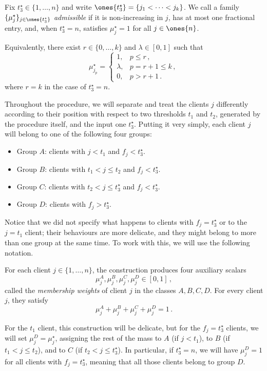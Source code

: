 \begin{property}\label{property:admissible-frontier-input}
    Fix $t_3^\star\in\{1,\dots,n\}$ and write $\ones{t_3^\star}=\{j_1<\dots<j_k\}$. We call a family $\{\mu_j^\star\}_{j\in\ones{t_3^\star}}$ \emph{admissible} if it is non-increasing in $j$, has at most one fractional entry, and, when $t_3^\star=n$, satisfies $\mu_j^\star=1$ for all $j\in\ones{n}$.

    Equivalently, there exist $r\in\{0,\dots,k\}$ and $\lambda\in[0,1]$ such that
    \begin{equation*}
        \mu_{j_p}^\star=
        \begin{cases}
            1, & p\le r\,,\\
            \lambda, & p=r+1\le k\,,\\
            0, & p>r+1\,.
        \end{cases}
    \end{equation*}
    where $r=k$ in the case of $t_3^\star=n$. 
\end{property}

Throughout the procedure, we will separate and treat the clients $j$ differently according to their position with respect to two thresholds $t_1$ and $t_2$, generated by the procedure itself, and the input one $t_3^\star$. Putting it very simply, each client $j$ will belong to one of the following four groups:
\begin{itemize}
    \item Group $A$: clients with $j < t_1$ and $f_j< t_3^\star$.
    \item Group $B$: clients with $t_1 < j \le t_2$ and $f_j< t_3^\star$.
    \item Group $C$: clients with $t_2 < j \le t_3^\star$ and $f_j< t_3^\star$.
    \item Group $D$: clients with $f_j > t_3^\star$.
\end{itemize}
Notice that we did not specify what happens to clients with $f_j = t_3^\star$ or to the $j=t_1$ client; their behaviours are more delicate, and they might belong to more than one group at the same time. To work with this, we will use the following notation.
\begin{definition}
    For each client $j\in\{1,\dots,n\}$, the construction produces four auxiliary scalars
    \begin{equation*}
        \mu_j^A,\mu_j^B,\mu_j^C,\mu_j^D\in[0,1]\,,
    \end{equation*}
    called the \emph{membership weights} of client $j$ in the classes $A,B,C,D$. For every client $j$, they satisfy
    \begin{equation*}
        \mu_j^A+\mu_j^B+\mu_j^C+\mu_j^D=1\,.
    \end{equation*}
\end{definition}
For the $t_1$ client, this construction will be delicate, but for the $f_j=t_3^\star$ clients, we will set $\mu_j^D=\mu_j^\star$, assigning the rest of the mass to $A$ (if $j<t_1$), to $B$ (if $t_1<j\le t_2$), and to $C$ (if $t_2<j\le t_3^\star$). In particular, if $t_3^\star=n$, we will have $\mu_j^D=1$ for all clients with $f_j=t_3^\star$, meaning that all those clients belong to group $D$.

